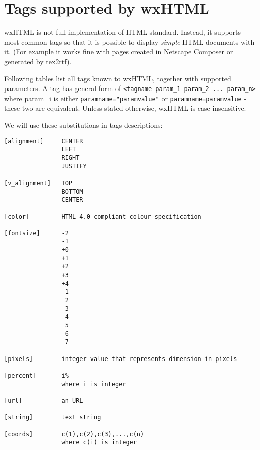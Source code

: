 \section{Tags supported by wxHTML}\label{htmltagssupported}

wxHTML is not full implementation of HTML standard. Instead, it supports most common tags so that it 
is possible to display {\it simple} HTML documents with it. (For example it works fine with pages created
in Netscape Composer or generated by tex2rtf).

Following tables list all tags known to wxHTML, together with supported parameters.
A tag has general form of {\tt <tagname param\_1 param\_2 ... param\_n>} where param\_i is
either {\tt paramname="paramvalue"} or {\tt paramname=paramvalue} - these two are equivalent. Unless stated 
otherwise, wxHTML is case-insensitive.



We will use these substitutions in tags descriptions:

\begin{verbatim}
[alignment]     CENTER
                LEFT
                RIGHT
                JUSTIFY

[v_alignment]   TOP
                BOTTOM
                CENTER
                
[color]         HTML 4.0-compliant colour specification

[fontsize]      -2
                -1
                +0
                +1
                +2
                +3
                +4
                 1
                 2
                 3
                 4
                 5
                 6
                 7

[pixels]        integer value that represents dimension in pixels

[percent]       i% 
                where i is integer

[url]           an URL 

[string]        text string

[coords]        c(1),c(2),c(3),...,c(n)
                where c(i) is integer

\end{verbatim}




